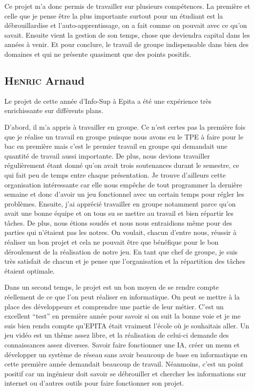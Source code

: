 \documentclass[a4paper, 12pt]{article}
\begin{document}
	\medbreak
\par Ce projet m’a donc permis de travailler sur plusieurs compétences. La première et celle que je pense être la plus importante surtout pour un étudiant est la débrouillardise et l’auto-apprentissage, on a fait comme on pouvait avec ce qu’on savait. Ensuite vient la gestion de son temps, chose que deviendra capital dans les années à venir. Et pour conclure, le travail de groupe indispensable dans bien des domaines et qui ne présente quasiment que des points positifs.

	\subsection{\textsc{Henric} Arnaud}
	
	Le projet de cette année d’Info-Sup à Epita a été une expérience très enrichissante sur différents plans.
\medbreak
\par D’abord, il m’a appris à travailler en groupe. Ce n’est certes pas la première fois que je réalise un travail en groupe puisque nous avons eu le TPE à faire pour le bac en première mais c’est le premier travail en groupe qui demandait une quantité de travail aussi importante. De plus, nous devions travailler régulièrement étant donné qu’on avait trois soutenances durant le semestre, ce qui fait peu de temps entre chaque présentation. Je trouve d’ailleurs cette organisation intéressante car elle nous empêche de tout programmer la dernière semaine et donc d’avoir un jeu fonctionnel avec un certain temps pour régler les problèmes. Ensuite, j’ai apprécié travailler en groupe notamment parce qu’on avait une bonne équipe et on tous su se mettre au travail et bien répartir les tâches. De plus, nous étions soudés et nous nous entraidions même pour des parties qui n’étaient pas les notres. On voulait, chacun d’entre nous, réussir à réaliser un bon projet et cela ne pouvait être que bénéfique pour le bon déroulement de la réalisation de notre jeu. En tant que chef de groupe, je suis très satisfait de chacun et je pense que l’organisation et la répartition des tâches étaient optimale.
\medbreak
\par Dans un second temps, le projet est un bon moyen de se rendre compte réellement de ce que l’on peut réaliser en informatique. On peut se mettre à la place des développeurs et comprendre une partie de leur métier. C’est un excellent “test” en première année pour savoir si on suit la bonne voie et je me suis bien rendu compte qu’EPITA était vraiment l’école où je souhaitais aller. Un jeu vidéo est un thème assez libre, et la réalisation de celui-ci demande des connaissances assez diverses. Savoir faire fonctionner une IA, créer un menu et développer un système de réseau sans avoir beaucoup de base en informatique en cette première année demandait beaucoup de travail. Néanmoins, c’est un point positif car un ingénieur doit savoir se débrouiller et chercher les informations sur internet ou d’autres outils pour faire fonctionner son projet.
\end{document}
